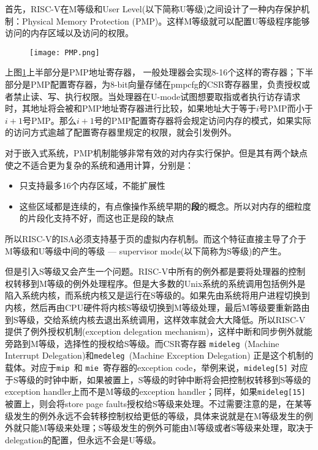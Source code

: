 \begin{itemize}
	首先，RISC-V在M等级和User Level(以下简称U等级)之间设计了一种内存保护机制：Physical Memory Protection (PMP)。这样M等级就可以配置U等级程序能够访问的内存区域以及访问的权限。
	\begin{figure}[!htbp]
		\centering
		\texttt{[image: PMP.png]}
		\label{fig:pmp}
	\end{figure}
	上图\ref{fig:pmp}上半部分是PMP地址寄存器， 一般处理器会实现8-16个这样的寄存器；下半部分是PMP配置寄存器，为8-bit向量存储在pmpcfg的CSR寄存器里，负责授权或者禁止读、写、执行权限。当处理器在U-mode试图想要取指或者执行访存请求时，其地址将会被和PMP地址寄存器进行比较，如果地址大于等于$ i $号PMP而小于$ i+1 $号PMP。那么$ i+1 $号的PMP配置寄存器将会规定访问内存的模式，如果实际的访问方式逾越了配置寄存器里规定的权限，就会引发例外\citep{Patterson:2017:RRO:3202479}。
	
	对于嵌入式系统，PMP机制能够非常有效的对内存实行保护。但是其有两个缺点使之不适合更为复杂的系统和通用计算，分别是：
	\begin{itemize}
		\item 只支持最多16个内存区域，不能扩展性
		\item 这些区域都是连续的，有点像操作系统早期的\textbf{段}的概念。所以对内存的细粒度的片段化支持不好，而这也正是段的缺点
	\end{itemize}
	
	所以RISC-V的ISA必须支持基于页的虚拟内存机制。而这个特征直接主导了介于M等级和U等级中间的等级 --- supervisor mode(以下简称为S等级)的产生。
	
	但是引入S等级又会产生一个问题。RISC-V中所有的例外都是要将处理器的控制权转移到M等级的例外处理程序。但是大多数的Unix系统的系统调用包括例外是陷入系统内核，而系统内核又是运行在S等级的。如果先由系统将用户进程切换到内核，然后再由CPU硬件将内核S等级切换到M等级处理，最后M等级要重新路由到S等级，交给系统内核去退出系统调用\citep{Patterson:2017:RRO:3202479}，这样效率就会大大降低。所以RISC-V提供了例外授权机制(exception delegation mechanism)，这样中断和同步例外就能旁路到M等级，选择性的授权给S等级。而CSR寄存器 {\tt mideleg }(Machine Interrupt Delegation)和{\tt medeleg }(Machine Exception  Delegation) 正是这个机制的载体。对应于{\tt mip }和 {\tt mie }寄存器的exception code，举例来说，{\tt mideleg[5]} 对应于S等级的时钟中断，如果被置上，S等级的时钟中断将会把控制权转移到S等级的exception handler上而不是M等级的exception handler；同样，如果{\tt mideleg[15]}被置上，则会将store page faults授权给S等级来处理\citep{Patterson:2017:RRO:3202479}。不过需要注意的是，在某等级发生的例外永远不会转移控制权给更低的等级，具体来说就是在M等级发生的例外就只能M等级来处理；S等级发生的例外可能由M等级或者S等级来处理，取决于delegation的配置，但永远不会是U等级\cite{Patterson:2017:RRO:3202479}。
	

\end{itemize}
